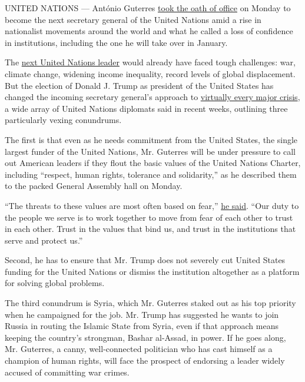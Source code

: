 UNITED NATIONS --- António Guterres
\href{http://www.un.org/apps/news/story.asp?NewsID=55783\#.WE8hjbIrK72}{took
the oath of office} on Monday to become the next secretary general of
the United Nations amid a rise in nationalist movements around the world
and what he called a loss of confidence in institutions, including the
one he will take over in January.

The
\href{https://www.nytimes.com/2016/10/14/world/americas/united-nations-un-antonio-guterres.html}{next
United Nations leader} would already have faced tough challenges: war,
climate change, widening income inequality, record levels of global
displacement. But the election of Donald J. Trump as president of the
United States has changed the incoming secretary general's approach to
\href{https://www.nytimes.com/2016/11/20/world/americas/united-nations-trump-climate-change-iran-cuba.html}{virtually
every major crisis}, a wide array of United Nations diplomats said in
recent weeks, outlining three particularly vexing conundrums.

The first is that even as he needs commitment from the United States,
the single largest funder of the United Nations, Mr. Guterres will be
under pressure to call out American leaders if they flout the basic
values of the United Nations Charter, including ``respect, human rights,
tolerance and solidarity,'' as he described them to the packed General
Assembly hall on Monday.

``The threats to these values are most often based on fear,''
\href{http://webtv.un.org/watch/secretary-general-designate-ant\%C3\%B3nio-guterres-statement-after-the-oath-of-office-general-assembly-60th-plenary-meeting/5244687141001}{he
said}. ``Our duty to the people we serve is to work together to move
from fear of each other to trust in each other. Trust in the values that
bind us, and trust in the institutions that serve and protect us.''

Second, he has to ensure that Mr. Trump does not severely cut United
States funding for the United Nations or dismiss the institution
altogether as a platform for solving global problems.

The third conundrum is Syria, which Mr. Guterres staked out as his top
priority when he campaigned for the job. Mr. Trump has suggested he
wants to join Russia in routing the Islamic State from Syria, even if
that approach means keeping the country's strongman, Bashar al-Assad, in
power. If he goes along, Mr. Guterres, a canny, well-connected
politician who has cast himself as a champion of human rights, will face
the prospect of endorsing a leader widely accused of committing war
crimes.


